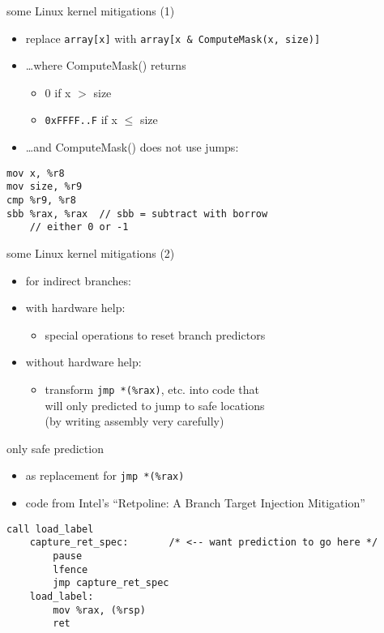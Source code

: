 \begin{frame}[fragile]{some Linux kernel mitigations (1)}
\begin{itemize}
\item replace \lstinline|array[x]| with \lstinline|array[x & ComputeMask(x, size)]|
\item \ldots where ComputeMask() returns
    \begin{itemize}
    \item 0 if x $>$ size
    \item \texttt{0xFFFF..F} if x $\le$ size
    \end{itemize}
\item \ldots and ComputeMask() does not use jumps:
\end{itemize}
\begin{lstlisting}[style=small,language=myasm]
mov x, %r8
mov size, %r9
cmp %r9, %r8
sbb %rax, %rax  // sbb = subtract with borrow
    // either 0 or -1
\end{lstlisting}
\end{frame}

\begin{frame}[fragile]{some Linux kernel mitigations (2)}
\begin{itemize}
\item for indirect branches:
\vspace{.5cm}
\item with hardware help:
    \begin{itemize}
    \item special operations to reset branch predictors
    \end{itemize}
\item without hardware help:
    \begin{itemize}
    \item transform \lstinline|jmp *(%rax)|, etc. into code that \\
        will only predicted to jump to safe locations \\
        (by writing assembly very carefully)
    \end{itemize}
\end{itemize}
\end{frame}

\begin{frame}[fragile]{only safe prediction}
\begin{itemize}
\item as replacement for \lstinline|jmp *(%rax)|
\item code from Intel's ``Retpoline: A Branch Target Injection Mitigation''
\end{itemize}
\begin{lstlisting}[language=myasm,style=small]
        call load_label
    capture_ret_spec:       /* <-- want prediction to go here */
        pause
        lfence
        jmp capture_ret_spec
    load_label:
        mov %rax, (%rsp)
        ret
\end{lstlisting}
\end{frame}
